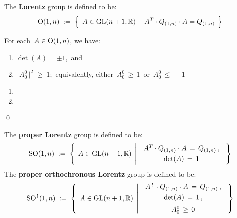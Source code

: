\vskip 0.5cm
\begin{definition}[$\textnormal{O}(1,n)$]
\mbox{}
\vskip 0.1cm
\noindent
The \textbf{Lorentz} group is defined to be:
\begin{equation*}
\textnormal{O}(1,n)
\; := \;
	\left\{\;\,
		A \overset{{\color{white}.}}{\in} \textnormal{GL}(n+1,\Re)
		\;\left\vert\;\,
			A^{T} \cdot Q_{(1,n)} \cdot A = Q_{(1,n)}
			\right.
		\;\right\}
\end{equation*}
\end{definition}

\vskip 0.5cm
\begin{proposition}
\mbox{}
\vskip 0.1cm
\noindent
For each \,$A \in \textnormal{O}(1,n)$, we have:
\begin{enumerate}
\item
	$\det(A) = \pm 1$,\, and
\item
	$\vert\,A^{0}_{0}\,\vert^{2} \;\geq\; 1$;\, equivalently, either \,$A^{0}_{0} \,\geq\, 1$\, or \,$A^{0}_{0} \,\leq\, -1$
\end{enumerate}
\end{proposition}
\proof
\begin{enumerate}
\item
\item
\end{enumerate}
\qed

\vskip 0.5cm
\begin{definition}
\mbox{}
\vskip 0.1cm
\noindent
The \textbf{proper Lorentz} group is defined to be:
\begin{equation*}
\SO(1,n)
\; := \;
	\left\{\;\,
		A \overset{{\color{white}.}}{\in} \GL(n+1,\Re)
		\;\left\vert\;\,
			\begin{array}{ccc}
			A^{T} \cdot Q_{(1,n)} \cdot A \,=\, Q_{(1,n)}\,,
			\\
			\textnormal{det}(A) \,\overset{{\color{white}1}}{=}\, 1
			\end{array}
			\right.
		\;\right\}
\end{equation*}
The \textbf{proper orthochronous Lorentz} group is defined to be:
\begin{equation*}
\SO^{\uparrow}(1,n)
\; := \;
	\left\{\;\,
		A \overset{{\color{white}.}}{\in} \GL(n+1,\Re)
		\;\left\vert\;\,
			\begin{array}{ccc}
			A^{T} \cdot Q_{(1,n)} \cdot A \,=\, Q_{(1,n)}\,,
			\\
			\textnormal{det}(A) \,\overset{{\color{white}1}}{=}\, 1\,,
			\\
			A^{0}_{0} \,\overset{{\color{white}1}}{\geq}\, 0
			\end{array}
			\right.
		\;\right\}
\end{equation*}
\end{definition}



